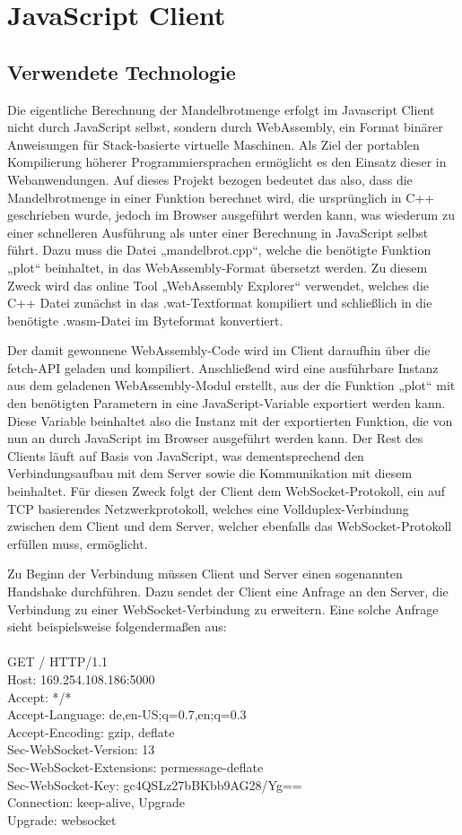 \documentclass[12pt, onecolumn, notitlepage]{scrartcl}
\begin{document}
\section{JavaScript Client}
\subsection{Verwendete Technologie}
Die eigentliche Berechnung der Mandelbrotmenge erfolgt im Javascript Client nicht durch JavaScript selbst, sondern durch WebAssembly, ein Format binärer Anweisungen für Stack-basierte virtuelle Maschinen. Als Ziel der portablen Kompilierung höherer Programmiersprachen ermöglicht es den Einsatz dieser in Webanwendungen. Auf dieses Projekt bezogen bedeutet das also, dass die Mandelbrotmenge in einer Funktion berechnet wird, die ursprünglich in C++ geschrieben wurde, jedoch im Browser ausgeführt werden kann, was wiederum zu einer schnelleren Ausführung als unter einer Berechnung in JavaScript selbst führt. Dazu muss die Datei „mandelbrot.cpp“, welche die benötigte Funktion „plot“ beinhaltet, in das WebAssembly-Format übersetzt werden. Zu diesem Zweck wird das online Tool „WebAssembly Explorer“ verwendet, welches die C++ Datei zunächst in das .wat-Textformat kompiliert und schließlich in die benötigte .wasm-Datei im Byteformat konvertiert. \par
Der damit gewonnene WebAssembly-Code wird im Client daraufhin über die fetch-API geladen und kompiliert. Anschließend wird eine ausführbare Instanz aus dem geladenen WebAssembly-Modul erstellt, aus der die Funktion „plot“ mit den benötigten Parametern in eine JavaScript-Variable exportiert werden kann. Diese Variable beinhaltet also die Instanz mit der exportierten Funktion, die von nun an durch JavaScript im Browser ausgeführt werden kann.
Der Rest des Clients läuft auf Basis von JavaScript, was dementsprechend den Verbindungsaufbau mit dem Server sowie die Kommunikation mit diesem beinhaltet. Für diesen Zweck folgt der Client dem WebSocket-Protokoll, ein auf TCP basierendes Netzwerkprotokoll, welches eine Vollduplex-Verbindung zwischen dem Client und dem Server, welcher ebenfalls das WebSocket-Protokoll erfüllen muss, ermöglicht. \par
Zu Beginn der Verbindung müssen Client und Server einen sogenannten Handshake durchführen. Dazu sendet der Client eine Anfrage an den Server, die Verbindung zu einer WebSocket-Verbindung zu erweitern. Eine solche Anfrage sieht beispielsweise folgendermaßen aus: \\ \\
GET / HTTP/1.1 \\
Host: 169.254.108.186:5000 \\
Accept: */* \\
Accept-Language: de,en-US;q=0.7,en;q=0.3 \\
Accept-Encoding: gzip, deflate \\
Sec-WebSocket-Version: 13 \\
Sec-WebSocket-Extensions: permessage-deflate \\
Sec-WebSocket-Key: gc4QSLz27bBKbb9AG28/Yg== \\
Connection: keep-alive, Upgrade \\
Upgrade: websocket \\
\end{document}
